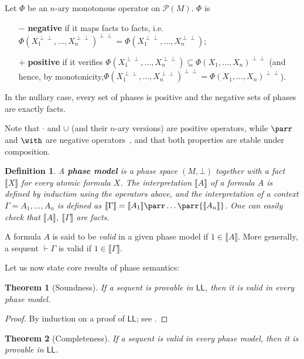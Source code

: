 \documentclass[11pt]{article}
\newtheorem{definition}{Definition}[section]
\newtheorem{theorem}{Theorem}[section]
\newcommand\LL{\textsf{LL}}
\newcommand\0{\textbf{0}}
\newcommand\1{\textbf{1}}
\newcommand\sem[1]{{\llbracket #1 \rrbracket}}
\newcommand\biperp{{\perp\perp}}
\begin{document}
Let $\Phi$ be an $n$-ary monotonous operator on $\mathcal P(M)$. $\Phi$ is
\begin{itemize}
    \item[$-$] \textbf{negative} if it maps facts to facts, i.e. $\Phi(X_1^\biperp, \dots, X_n^\biperp)^\biperp = \Phi(X_1^\biperp, \dots, X_n^\biperp)$;
    \item[$+$] \textbf{positive} if it verifies $\Phi(X_1^\biperp, \dots, X_n^\biperp) \subseteq \Phi(X_1, \dots, X_n)^\biperp$ (and
    hence, by monotonicity,\linebreak ${\Phi(X_1^\biperp, \dots, X_n^\biperp)^\biperp = \Phi(X_1, \dots, X_n)^\biperp}$).
\end{itemize}
In the nullary case, every set of phases is positive and the negative sets of phases are exactly facts.

Note that $\cdot$ and $\cup$ (and their $n$-ary versions) are positive operators,
while $\parr$ and $\with$ are negative operators~\cite[appendix F]{meaning}, and
that both properties are stable under composition.

\begin{definition}
    A \textbf{phase model} is a phase space $(M, \bot)$ together with a fact $\sem{X}$ for every atomic
    formula $X$. The interpretation $\sem{A}$ of a formula $A$ is defined by induction using the operators above,
    and the interpretation of a context $\Gamma = A_1, \ldots, A_n$ is defined as $\sem{\Gamma} = \sem{A_1} \parr \dots \parr \sem{A_n}$.
    One can easily check that $\sem{A}$, $\sem{\Gamma}$ are facts.
\end{definition}

A formula $A$ is said to be \emph{valid} in a given phase model if $1 \in \sem{A}$. More generally, a sequent
$\vdash \Gamma$ is valid if $1 \in \sem{\Gamma}$.

Let us now state core results of phase semantics:

\begin{theorem}[Soundness]
    If a sequent is provable in $\LL$, then it is valid in every phase model.
\end{theorem}
\begin{proof}
    By induction on a proof of $\LL$; see \cite[theorem 1]{okada}.
\end{proof}

\begin{theorem}[Completeness]
    If a sequent is valid in every phase model, then it is provable in $\LL$.
\end{theorem}
\end{document}
